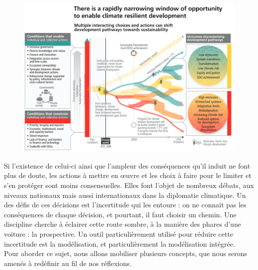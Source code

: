 \begin{figure}[h!]
    \centering
    \includegraphics[width=\linewidth]{figures/trajectoire_spm6.png}
    \label{fig:pathways}
\end{figure}

Si l'existence de celui-ci ainsi que l'ampleur des conséquences qu'il induit ne font plus de doute, les actions à mettre en œuvre et les choix à faire pour le limiter et s'en protéger sont moins consensuelles. Elles font l'objet de nombreux débats, aux niveaux nationaux mais aussi internationaux dans la diplomatie climatique. Un des défis de ces décisions est l'incertitude qui les entoure : on ne connait pas les conséquences de chaque décision, et pourtant, il faut choisir un chemin. Une discipline cherche à éclairer cette route sombre, à la manière des phares d'une voiture : la prospective. Un outil particulièrement utilisé pour réduire cette incertitude est la modélisation, et particulièrement la modélisation intégrée. \\


Pour aborder ce sujet, nous allons mobiliser plusieurs concepts, que nous serons amenés à redéfinir au fil de nos réflexions. 

